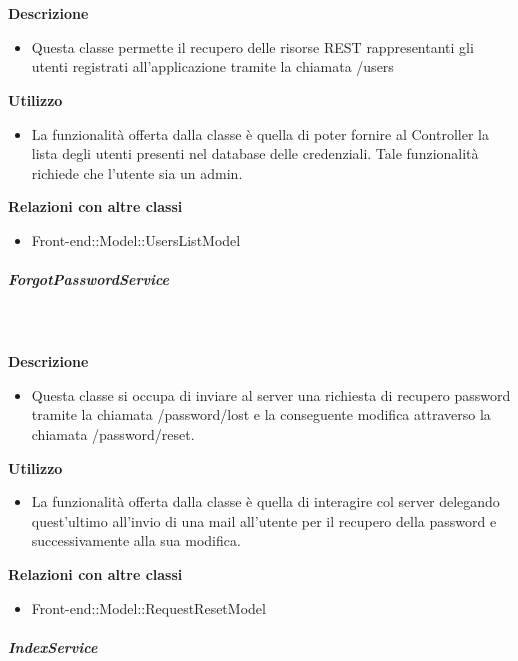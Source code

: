 				\textbf{\\ \\ Descrizione} 
					\begin{itemize}
						\item[] Questa classe permette il recupero delle risorse REST rappresentanti gli utenti registrati all'applicazione tramite la chiamata /users
					\end{itemize}      
				\textbf{Utilizzo}  
					\begin{itemize}
						\item[] La funzionalità offerta dalla classe è quella di poter fornire al Controller la lista degli utenti presenti nel database delle credenziali.
Tale funzionalità richiede che l'utente sia un admin.
					\end{itemize}
					\textbf{Relazioni con altre classi}
					\begin{itemize}
							\item{Front-end::Model::UsersListModel}
					\end{itemize}
			\subparagraph{ForgotPasswordService}
				
				\textbf{\\ \\ Descrizione} 
					\begin{itemize}
						\item[] Questa classe si occupa di inviare al server una richiesta di recupero password tramite la chiamata /password/lost e la conseguente modifica attraverso la chiamata /password/reset.
					\end{itemize}      
				\textbf{Utilizzo}  
					\begin{itemize}
						\item[] La  funzionalità offerta dalla classe è quella di interagire col server delegando quest'ultimo all'invio di una mail all'utente per il recupero della password e successivamente alla sua modifica.
					\end{itemize}
					\textbf{Relazioni con altre classi}
					\begin{itemize}
							\item{Front-end::Model::RequestResetModel}
					\end{itemize}
			\subparagraph{IndexService}
				
